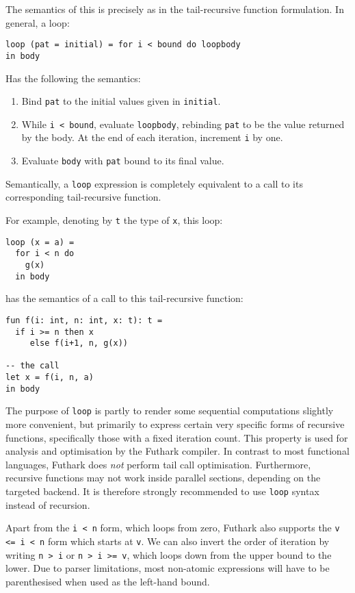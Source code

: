 \documentclass[11pt]{book}
\begin{document}
The semantics of this is precisely as in the tail-recursive function
formulation.  In general, a loop:

\begin{lstlisting}
loop (pat = initial) = for i < bound do loopbody
in body
\end{lstlisting}

Has the following the semantics:

\begin{enumerate}
\item Bind \texttt{pat} to the initial values given in
  \texttt{initial}.
\item While \texttt{i < bound}, evaluate \texttt{loopbody}, rebinding
  \texttt{pat} to be the value returned by the body.  At the end of
  each iteration, increment \texttt{i} by one.
\item Evaluate \texttt{body} with \texttt{pat} bound to its final
  value.
\end{enumerate}

Semantically, a \texttt{loop} expression is completely equivalent to a
call to its corresponding tail-recursive function.

For example, denoting by \texttt{t} the type of \texttt{x}, this
loop:

\begin{lstlisting}
loop (x = a) =
  for i < n do
    g(x)
  in body
\end{lstlisting}

has the semantics of a call to this tail-recursive function:

\begin{lstlisting}
fun f(i: int, n: int, x: t): t =
  if i >= n then x
     else f(i+1, n, g(x))

-- the call
let x = f(i, n, a)
in body
\end{lstlisting}

The purpose of \texttt{loop} is partly to render some sequential
computations slightly more convenient, but primarily to express
certain very specific forms of recursive functions, specifically those
with a fixed iteration count.  This property is used for analysis and
optimisation by the Futhark compiler.  In contrast to most functional
languages, Futhark does \textit{not} perform tail call optimisation.
Furthermore, recursive functions may not work inside parallel
sections, depending on the targeted backend.  It is therefore strongly
recommended to use \texttt{loop} syntax instead of recursion.

Apart from the \texttt{i < n} form, which loops from zero, Futhark
also supports the \texttt{v <= i < n} form which starts at \texttt{v}.
We can also invert the order of iteration by writing \texttt{n > i} or
\texttt{n > i >= v}, which loops down from the upper bound to the
lower.  Due to parser limitations, most non-atomic expressions will
have to be parenthesised when used as the left-hand bound.
\end{document}

